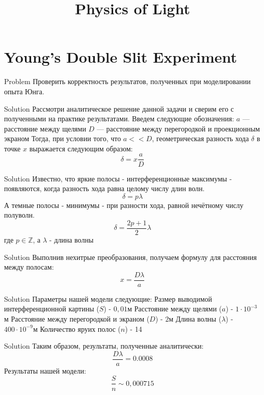 \documentclass{beamer}
\title{Physics of Light}
\begin{document}
\begin{frame}
  \titlepage
\end{frame}

\section{Young's Double Slit Experiment}

\begin{frame}[fragile]{Problem}
  Проверить корректность результатов, полученных при моделировании опыта Юнга.
\end{frame}

\begin{frame}[fragile]{Solution}
  Рассмотри аналитическое решение данной задачи и сверим его с полученными на практике результатами.
  \newline
  \newline
  \pause
  Введем следующие обозначения:
  \newline
  \pause
  $a$ — расстояние между щелями
  \newline
  \pause
  $D$ — расстояние между перегородкой и проекционным экраном
  \newline
  \newline
  \pause
  Тогда, при условии того, что $a << D$, геометрическая разность хода $\delta$ в точке $x$
  выражается следующим образом:
  \[\delta = x \dfrac{a}{D}\] 
\end{frame}

\begin{frame}[fragile]{Solution}
  Известно, что яркие полосы - интерференционные максимумы - появляются, когда разность хода
  равна целому числу длин волн.
  \[\delta = p \lambda\]
  \newline
  \pause
  А темные полосы - минимумы - при разности хода, равной нечётному числу полуволн.
  \[\delta = \dfrac{2p + 1}{2 } \lambda\]
  \pause
  где $p \in \mathbb{Z}$, а $\lambda$ - длина волны
\end{frame}

\begin{frame}[fragile]{Solution}
  Выполнив нехитрые преобразования, получаем формулу для расстояния между полосам:
  \[x = \dfrac{D \lambda}{a}\]
\end{frame}

\begin{frame}[fragile]{Solution}
  Параметры нашей модели следующие:
  \newline
  \newline
  \pause
  Размер выводимой интерференционной картины ($S$) - $0,01$м
  \newline
  \pause
  Расстояние между щелями ($a$) - $1 \cdot 10^{-3}$м
  \newline
  \pause
  Расстояние между перегородкой и экраном ($D$) - $2$м
  \newline
  \pause
  Длина волны ($\lambda$) - $400 \cdot 10^{-9}$м
  \newline
  \pause
  Количество яруих полос ($n$) - 14
\end{frame}

\begin{frame}[fragile]{Solution}
  Таким образом, результаты, полученные аналитически:
  \[\dfrac{D \lambda}{a} = 0.0008\]
  \pause
  Результаты нашей модели:
  \[\dfrac{S}{n} \sim 0,000715\]
\end{frame}
  
\end{document}
